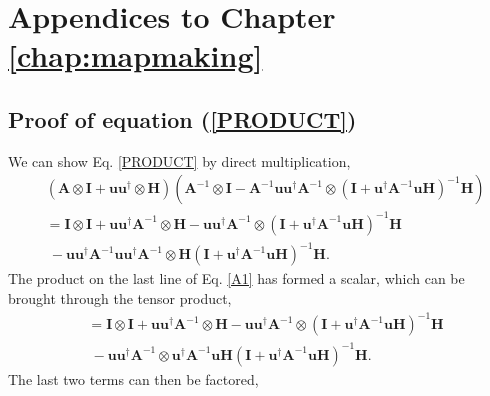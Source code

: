 
\chapter{Appendices to Chapter \ref{chap:mapmaking}}

\section{Proof of equation (\ref{PRODUCT})} 
\label{app:mm:sec:proof}

We can show Eq. \eqref{PRODUCT} by direct multiplication,
\begin{align}
&\left(\mathbf{A} \otimes \mathbf{I} + \mathbf{u}\mathbf{u}^\dagger \otimes \mathbf{H} \right) 
 \left( \mathbf{A}^{-1} \otimes \mathbf{I} - \mathbf{A}^{-1}\mathbf{u}\mathbf{u}^\dagger\mathbf{A}^{-1} \otimes \left(\mathbf{I} + \mathbf{u}^\dagger\mathbf{A}^{-1}\mathbf{u} \mathbf{H}\right)^{-1} \mathbf{H} \right)
 \nonumber \\
 &= \mathbf{I} \otimes \mathbf{I} + \mathbf{u}\mathbf{u}^\dagger\mathbf{A}^{-1} \otimes \mathbf{H} - \mathbf{u}\mathbf{u}^\dagger\mathbf{A}^{-1}\otimes \left(\mathbf{I} + \mathbf{u}^\dagger\mathbf{A}^{-1}\mathbf{u} \mathbf{H}\right)^{-1} \mathbf{H}
\nonumber \\
&~- \mathbf{u}\mathbf{u}^\dagger\mathbf{A}^{-1}\mathbf{u}\mathbf{u}^\dagger\mathbf{A}^{-1}\otimes \mathbf{H} \left(\mathbf{I} + \mathbf{u}^\dagger\mathbf{A}^{-1}\mathbf{u} \mathbf{H}\right)^{-1} \mathbf{H}. \label{A1}
\end{align}
The product on the last line of Eq. \eqref{A1} has formed a scalar, which can be brought through the tensor product,
\begin{align}
&= \mathbf{I} \otimes \mathbf{I} + \mathbf{u}\mathbf{u}^\dagger\mathbf{A}^{-1} \otimes \mathbf{H} - \mathbf{u}\mathbf{u}^\dagger\mathbf{A}^{-1}\otimes \left(\mathbf{I} + \mathbf{u}^\dagger\mathbf{A}^{-1}\mathbf{u} \mathbf{H}\right)^{-1} \mathbf{H}
\nonumber \\
&~- \mathbf{u}\mathbf{u}^\dagger\mathbf{A}^{-1}\otimes \mathbf{u}^\dagger\mathbf{A}^{-1}\mathbf{u}\mathbf{H} \left(\mathbf{I} + \mathbf{u}^\dagger\mathbf{A}^{-1}\mathbf{u}\mathbf{H}\right)^{-1} \mathbf{H}. 
\end{align}
The last two terms can then be factored,
